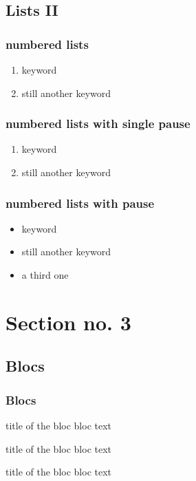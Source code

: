 \documentclass[hyperref={pdfpagelabels=false}]{beamer}
\begin{document}
\subsection{Lists II}
\begin{frame}
\frametitle{numbered lists}
\begin{enumerate}
\item keyword
\item still another keyword
\end{enumerate}
\end{frame}

\begin{frame}
\frametitle{numbered lists with single pause}
\begin{enumerate}
\item keyword  \pause 
\item still another keyword
\end{enumerate}
\end{frame}

\begin{frame}
\frametitle{numbered lists with pause}
\begin{itemize}[<+->]
\item keyword  
\item still another keyword
\item a third one 
\end{itemize} 
\end{frame}

\section{Section no. 3}
\subsection{Blocs}
\begin{frame}
\frametitle{Blocs}

\begin{block}{title of the bloc}
bloc text
\end{block}

\begin{exampleblock}{title of the bloc}
bloc text
\end{exampleblock}

\begin{alertblock}{title of the bloc}
bloc text
\end{alertblock}
\end{frame}
\end{document}
